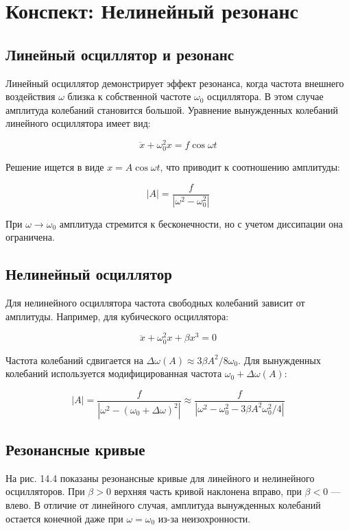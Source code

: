 \documentclass[10pt]{article}
\begin{document}
\section*{Конспект: Нелинейный резонанс}

\subsection*{Линейный осциллятор и резонанс}
Линейный осциллятор демонстрирует эффект резонанса, когда частота внешнего воздействия $\omega$ близка к собственной частоте $\omega_{0}$ осциллятора. В этом случае амплитуда колебаний становится большой. Уравнение вынужденных колебаний линейного осциллятора имеет вид:

\begin{equation*}
\ddot{x}+\omega_{0}^{2} x=f \cos \omega t
\end{equation*}

Решение ищется в виде $x=A \cos \omega t$, что приводит к соотношению амплитуды:

\begin{equation*}
|A|=\frac{f}{\left|\omega^{2}-\omega_{0}^{2}\right|}
\end{equation*}

При $\omega \to \omega_{0}$ амплитуда стремится к бесконечности, но с учетом диссипации она ограничена.

\subsection*{Нелинейный осциллятор}
Для нелинейного осциллятора частота свободных колебаний зависит от амплитуды. Например, для кубического осциллятора:

\begin{equation*}
\ddot{x}+\omega_{0}^{2} x+\beta x^{3}=0
\end{equation*}

Частота колебаний сдвигается на $\Delta \omega(A) \approx 3 \beta A^{2} / 8 \omega_{0}$. Для вынужденных колебаний используется модифицированная частота $\omega_{0}+\Delta \omega(A)$:

\begin{equation*}
|A|=\frac{f}{\left|\omega^{2}-\left(\omega_{0}+\Delta \omega\right)^{2}\right|} \approx \frac{f}{\left|\omega^{2}-\omega_{0}^{2}-3 \beta A^{2} \omega_{0}^{2} / 4\right|}
\end{equation*}

\subsection*{Резонансные кривые}
На рис. 14.4 показаны резонансные кривые для линейного и нелинейного осцилляторов. При $\beta>0$ верхняя часть кривой наклонена вправо, при $\beta<0$ — влево. В отличие от линейного случая, амплитуда вынужденных колебаний остается конечной даже при $\omega = \omega_{0}$ из-за неизохронности.
\end{document}
